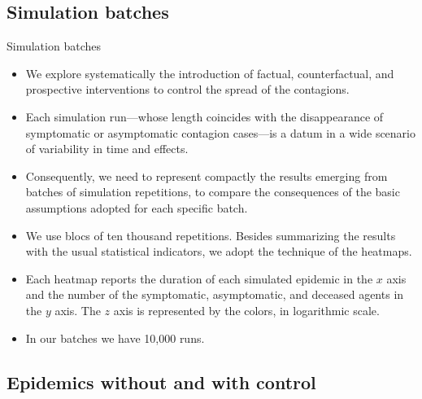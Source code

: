 \documentclass[8pt]{beamer}
\begin{document}
\subsection{Simulation batches}

\begin{frame}{Simulation batches}

  \begin{itemize}
  \item

We explore systematically the introduction of factual, counterfactual, and prospective interventions to control the spread of the contagions. 

  \item
Each simulation run---whose length coincides with the disappearance of symptomatic or asymptomatic contagion cases---is a datum in a wide scenario of variability in time and effects.   
  
  \item
Consequently, we need to represent compactly the results  emerging from batches of simulation repetitions, to compare the  consequences of the basic assumptions adopted for each specific batch.

 \item
We use blocs of ten thousand repetitions. Besides summarizing the results with the usual statistical indicators, we adopt the technique of the heatmaps.

\item
Each heatmap reports the duration of each simulated epidemic in the $x$ axis and the number of the symptomatic, asymptomatic, and deceased agents in the $y$ axis. The $z$ axis is represented by the colors, in logarithmic scale. 

\item
In our batches we have 10,000 runs.

\end{itemize}
\end{frame}

\subsection{Epidemics without and with control}
\end{document}
